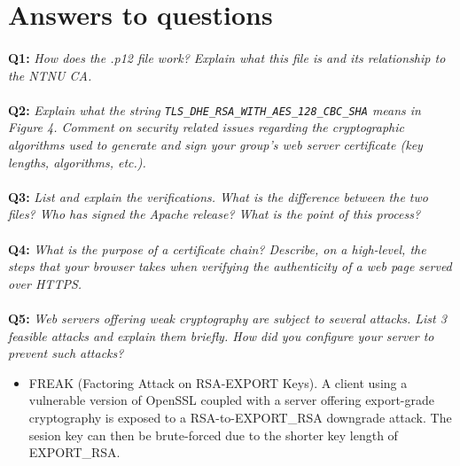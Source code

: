 \section{Answers to questions}

\paragraph{}
\textbf{Q1:}
\textit{How does the .p12 file work? Explain what this file is and its relationship to the NTNU CA.}

\paragraph{}
\textbf{Q2:}
\cprotect\textit{Explain what the string \verb/TLS_DHE_RSA_WITH_AES_128_CBC_SHA/ means in Figure 4. Comment on security related issues regarding the cryptographic algorithms used to generate and sign your group's web server certificate (key lengths, algorithms, etc.).}

\paragraph{}
\textbf{Q3:}
\textit{List and explain the verifications. What is the difference between the two files? Who has signed the Apache release? What is the point of this process?}

\paragraph{}
\textbf{Q4:}
\textit{What is the purpose of a certificate chain? Describe, on a high-level, the steps that your browser takes when verifying the authenticity of a web page served over HTTPS.}

\paragraph{}
\textbf{Q5:}
\textit{Web servers offering weak cryptography are subject to several attacks. List 3 feasible attacks and explain them briefly. How did you configure your server to prevent such attacks?}

\begin{itemize}
    \item
        FREAK (Factoring Attack on RSA-EXPORT Keys)\cite{freak-ssl-tls}.
        A client using a vulnerable version of OpenSSL coupled with a server offering export-grade cryptography is exposed to a RSA-to-EXPORT\_RSA downgrade attack.
        The sesion key can then be brute-forced due to the shorter key length of EXPORT\_RSA.

\end{itemize}

